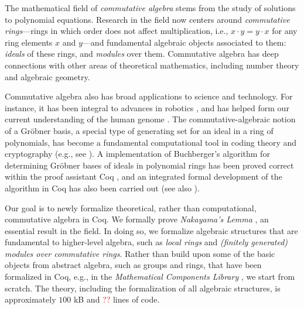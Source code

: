 \documentclass{article}
\begin{document}
The mathematical field of \emph{commutative algebra} stems from the study of solutions to polynomial equations.  Research in the field now centers around \emph{commutative rings}---rings in which order does not affect multiplication, i.e., $x \cdot y = y \cdot x$ for any ring elements $x$ and $y$---and fundamental algebraic objects associated to them:  \emph{ideals} of these rings, and \emph{modules} over them. 
Commutative algebra has deep connections with other areas of theoretical mathematics, including number theory and algebraic geometry. 

Commutative algebra also has broad applications to science and technology.  For instance, it has been integral to advances in robotics \cite{cox-little-oshea}, and has helped form our current understanding of the human genome \cite{genetic-algebra}. 
The commutative-algebraic notion of a Gr\"obner basis, a special type of generating set for an ideal in a ring of polynomials, has become a fundamental computational tool in 
coding theory and cryptography (e.g., see  \cite{grobner-bases-cryptography}).
A implementation of Buchberger's algorithm \cite{buchberger} for determining 
Gr\"obner bases of ideals in polynomial rings has been proved correct within the proof assistant Coq \cite{the_coq_development_team_2019_3476303,thery-buchberger}, and an integrated formal development of the algorithm in Coq has also been carried out \cite{persson2001integrated} (see also \cite{grobner-type-theory}). 

Our goal is to newly formalize theoretical, rather than computational, commutative algebra in Coq. 
We formally prove \emph{Nakayama's Lemma} \cite{nakayama-1951, azumaya}, an essential result in the field. 
In doing so, we formalize algebraic structures that are fundamental to higher-level algebra, such as 
\emph{local rings} and \emph{(finitely generated) modules over commutative rings}. 
Rather than build upon some of the basic objects from abstract algebra, such as groups and rings, that have been formalized in Coq, e.g., in the  
\emph{Mathematical Components Library} 
\cite{mathcomp}, we start from scratch. 
 The theory, including the formalization of all algebraic structures, is approximately  $100$ kB and \textcolor{red}{??} lines of code.
 
\end{document}
